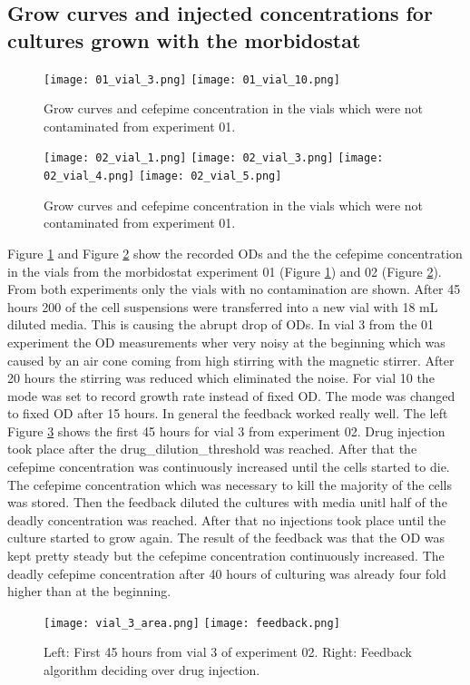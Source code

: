 \subsection{Grow curves and injected concentrations for cultures grown with the morbidostat}
\begin{figure}[H]
	\texttt{[image: 01\_vial\_3.png]}
	\texttt{[image: 01\_vial\_10.png]}
	\caption{Grow curves and cefepime concentration in the vials which were not contaminated from experiment 01.}
	\label{figure:01_vials}
\end{figure}

\begin{figure}[h]	
	\texttt{[image: 02\_vial\_1.png]}
	\texttt{[image: 02\_vial\_3.png]}
	\texttt{[image: 02\_vial\_4.png]}
	\texttt{[image: 02\_vial\_5.png]}	
	\caption{Grow curves and cefepime concentration in the vials which were not contaminated from experiment 01.}
	\label{figure:02_vials}
\end{figure}
Figure \ref{figure:01_vials} and Figure \ref{figure:02_vials} show the recorded ODs and the the cefepime concentration in the vials from the morbidostat experiment 01 (Figure \ref{figure:01_vials}) and 02 (Figure \ref{figure:02_vials}). From both experiments only the vials with no contamination are shown. After 45 hours 200 \textmu of the cell suspensions were transferred into a new vial with 18 mL diluted media. This is causing the abrupt drop of ODs. In vial 3 from the 01 experiment the OD measurements wher very noisy at the beginning which was caused by an air cone coming from high stirring with the magnetic stirrer. After 20 hours the stirring was reduced which eliminated the noise. For vial 10 the mode was set to record growth rate instead of fixed OD. The mode was changed to fixed OD after 15 hours. 
In general the feedback worked really well. The left Figure \ref{figure:vial_3_area} shows the first 45 hours for vial 3 from experiment 02. Drug injection took place after the drug\_dilution\_threshold was reached. After that the cefepime concentration was continuously increased until the cells started to die. The cefepime concentration which was necessary to kill the majority of the cells was stored. Then the feedback diluted the cultures with media unitl half of the deadly concentration was reached. After that no injections took place until the culture started to grow again. The result of the feedback was that the OD was kept pretty steady but the cefepime concentration continuously increased. The deadly cefepime concentration after 40 hours of culturing was already four fold higher than at the beginning. 
\begin{figure}[H]
	\texttt{[image: vial\_3\_area.png]}
	\texttt{[image: feedback.png]}
	\caption{Left: First 45 hours from vial 3 of experiment 02. Right: Feedback algorithm deciding over drug injection.}
	\label{figure:vial_3_area}
\end{figure}
